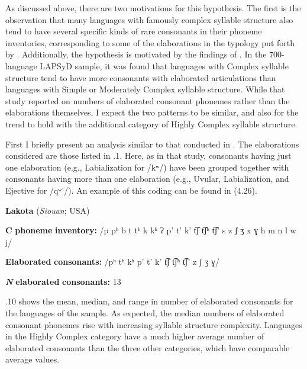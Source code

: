   As discussed above, there are two motivations for this hypothesis. The first is the observation that many languages with famously complex syllable structure also tend to have several specific kinds of rare consonants in their phoneme inventories, corresponding to some of the elaborations in the typology put forth by \citet{LindblomMaddieson1988}. Additionally, the hypothesis is motivated by the findings of \citet{MaddiesonEtAl2013}. In the 700-language LAPSyD sample, it was found that languages with Complex syllable structure tend to have more consonants with elaborated articulations than languages with Simple or Moderately Complex syllable structure. While that study reported on numbers of elaborated consonant phonemes rather than the elaborations themselves, I expect the two patterns to be similar, and also for the trend to hold with the additional category of Highly Complex syllable structure.

  First I briefly present an analysis similar to that conducted in \citet{MaddiesonEtAl2013}. The elaborations considered are those listed in .1. Here, as in that study, consonants having just one elaboration (e.g., Labialization for /kʷ/) have been grouped together with consonants having more than one elaboration (e.g., Uvular, Labialization, and Ejective for /qʷ’/). An example of this coding can be found in (4.26).

\ea\label{ex:(4.26)}
  \textbf{Lakota} (\textit{Siouan}; USA)

\textbf{C} \textbf{phoneme} \textbf{inventory:} /p pʰ b t tʰ k kʰ ʔ p’ t’ k’ t͡ʃ t͡ʃʰ t͡ʃ’ s z ʃ ʒ x ɣ h m n l w j/

\textbf{Elaborated} \textbf{consonants:} /pʰ tʰ kʰ p’ t’ k’ t͡ʃ t͡ʃʰ t͡ʃ’ z ʃ ʒ ɣ/

\textbf{\textit{N}} \textbf{elaborated} \textbf{consonants:} 13
\z

  .10 shows the mean, median, and range in number of elaborated consonants for the languages of the sample. As expected, the median numbers of elaborated consonant phonemes rise with increasing syllable structure complexity. Languages in the Highly Complex category have a much higher average number of elaborated consonants than the three other categories, which have comparable average values.

